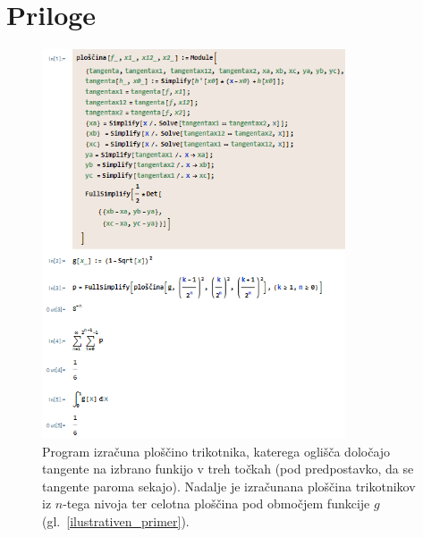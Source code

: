 \documentclass[a4paper, 12pt, titlepage]{article}
\begin{document}
\section{Priloge}

\begin{figure}[h]
    \centering
    \includegraphics[width=0.8\textwidth]{slike/ilustrativen_primer_wolfram.png}
    \caption{Program izračuna ploščino trikotnika, katerega oglišča določajo tangente na izbrano funkijo v treh točkah (pod predpostavko, da se tangente paroma sekajo). Nadalje je izračunana ploščina trikotnikov iz $ n $-tega nivoja ter celotna ploščina pod območjem funkcije $ g $ (gl.~\ref{ilustrativen_primer}).}
    \label{ilustrativen_primer_wolfram}
\end{figure}
\newpage
\nocite{*}      %
\printbibliography
\end{document}
